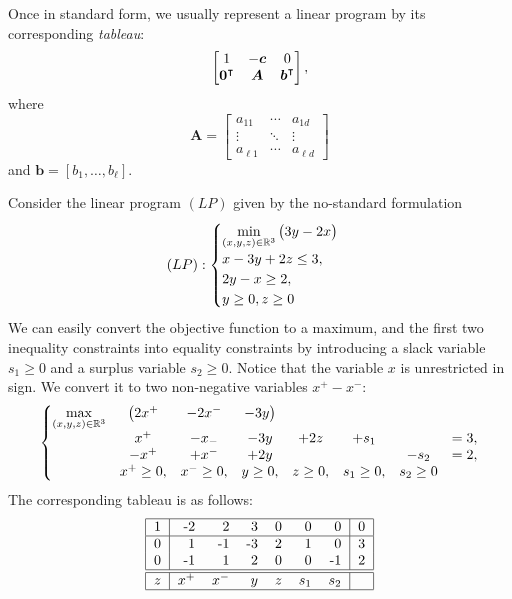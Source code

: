 \separator 

Once in standard form, we usually represent a linear program by its corresponding \emph{tableau}:
\begin{equation*}
\begin{bmatrix} 1 & -\boldsymbol{c} & 0 \\ {\boldsymbol{0}}^\intercal & \boldsymbol{A} & {\boldsymbol{b}}^\intercal \end{bmatrix},
\end{equation*}
where
\begin{equation*}
\boldsymbol{A} = \begin{bmatrix} a_{11} & \dotsb & a_{1d} \\ \vdots & \ddots & \vdots \\ a_{\ell 1} & \dotsb & a_{\ell d} \end{bmatrix}
\end{equation*}
and $\boldsymbol{b} = [b_1, \dotsc, b_\ell]$.

\begin{example}\label{example:FirstLinearProgram}
Consider the linear program $(LP)$ given by the no-standard formulation
\begin{equation*}
(LP): \begin{cases}
\displaystyle{\min_{(x,y,z) \in \mathbb{R}^3} \big( 3y-2x \big)} \\
x - 3y + 2z \leq 3, \\
2y-x \geq 2, \\
y \geq 0, z \geq 0 \\
\end{cases}
\end{equation*}
We can easily convert the objective function to a maximum, and the first two inequality constraints into equality constraints by introducing a slack variable $s_1 \geq 0$ and a surplus variable $s_2 \geq 0$.  Notice that the variable $x$ is unrestricted in sign.  We convert it to two non-negative variables $x^+ - x^-$:
\begin{equation*}
\left\{
\begin{matrix}
\displaystyle{\max_{(x,y,z) \in \mathbb{R}^3}} & \big( 2x^+ & -2x^- &-3y \big) \\
& x^+ & -x_- & -3y & +2z & +s_1 & & = 3, \\
& -x^+ & +x^- & +2y & & &-s_2 &= 2, \\
&x^+ \geq 0, &x^- \geq 0, &y \geq 0, &z \geq 0, &s_1 \geq 0, &s_2 \geq 0 
\end{matrix}
\right.
\end{equation*}
The corresponding tableau is as follows:
\begin{equation*}
\begin{tabular}{|r|rrrrrr|r|}
\hline 
1 & -2 & 2  & 3  & 0 & 0 & 0  & 0 \\ \hline
0 & 1  & -1 & -3 & 2 & 1 & 0  & 3 \\
0 & -1 &  1 & 2  & 0 & 0 & -1 & 2 \\ \hline \hline
$z$ & $x^+$ & $x^-$ & $y$ & $z$ & $s_1$ & $s_2$ & \\ \hline
\end{tabular}
\end{equation*}
\end{example}

